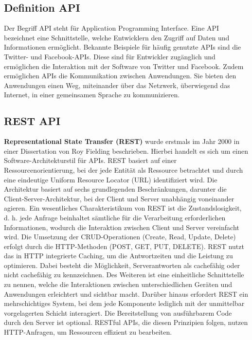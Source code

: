 \subsection{Definition API} %
\label{sec:grundlegendedefinitionvonapi}
Der Begriff \glqq API\grqq{}  steht für \glqq Application Programming Interface\grqq{}. Eine API bezeichnet eine Schnittstelle, welche Entwicklern den Zugriff auf Daten und Informationen ermöglicht. Bekannte Beispiele für häufig genutzte APIs sind die Twitter- und Facebook-APIs. Diese sind für Entwickler zugänglich und ermöglichen die Interaktion mit der Software von Twitter und Facebook. Zudem ermöglichen APIs die Kommunikation zwischen Anwendungen. Sie bieten den Anwendungen einen Weg, miteinander über das Netzwerk, überwiegend das Internet, in einer gemeinsamen Sprache zu kommunizieren. \citep{apistrategyguide}
\subsection{REST API} %
\label{sec:restapi}
 \textbf{Representational State Transfer (REST)} wurde erstmals im Jahr 2000 in einer Dissertation von Roy Fielding beschrieben. Hierbei handelt es sich um einen Software-Architekturstil für APIs. REST basiert auf einer Ressourcenorientierung, bei der jede Entität als Ressource betrachtet und durch eine eindeutige Uniform Resource Locator (URL) identifiziert wird. Die Architektur basiert auf sechs grundlegenden Beschränkungen, darunter die Client-Server-Architektur, bei der Client und Server unabhängig voneinander agieren. Ein wesentliches Charakteristikum von REST ist die Zustandslosigkeit, d. h. jede Anfrage beinhaltet sämtliche für die Verarbeitung erforderlichen Informationen, wodurch die Interaktion zwischen Client und Server vereinfacht wird. Die Umsetzung der CRUD-Operationen (Create, Read, Update, Delete) erfolgt durch die HTTP-Methoden (POST, GET, PUT, DELETE). REST nutzt das in HTTP integrierte Caching, um die Antwortzeiten und die Leistung zu optimieren. Dabei besteht die Möglichkeit, Serverantworten als cachefähig oder nicht cachefähig zu kennzeichnen. Des Weiteren ist eine einheitliche Schnittstelle zu nennen, welche die Interaktionen zwischen unterschiedlichen Geräten und Anwendungen erleichtert und sichtbar macht. Darüber hinaus erfordert REST ein mehrschichtiges System, bei dem jede Komponente lediglich mit der unmittelbar vorgelagerten Schicht interagiert. Die Bereitstellung von ausführbarem Code durch den Server ist optional. RESTful APIs, die diesen Prinzipien folgen, nutzen HTTP-Anfragen, um Ressourcen effizient zu bearbeiten. \citep{Fielding2000}  \citep{graphqlreplacerest}
